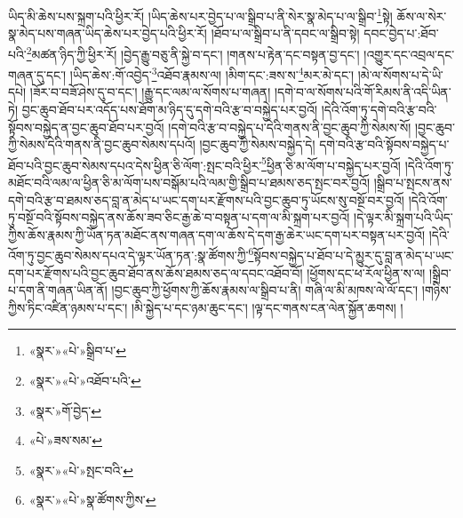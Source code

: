 ཡིད་མི་ཆེས་པས་སྐྲག་པའི་ཕྱིར་རོ། །ཡིད་ཆེས་པར་བྱེད་པ་ལ་སྒྲིབ་པ་ནི་སེར་སྣ་མེད་པ་ལ་སྒྲིབ་\footnote{«སྣར་»«པེ་»སྒྲིབ་པ་}སྟེ། ཆོས་ལ་སེར་སྣ་མེད་པས་གཞན་ཡིད་ཆེས་པར་བྱེད་པའི་ཕྱིར་རོ། །ཐོབ་པ་ལ་སྒྲིབ་པ་ནི་དབང་ལ་སྒྲིབ་སྟེ། དབང་བྱེད་པ་:ཐོབ་པའི་\footnote{«སྣར་»«པེ་»འཐོབ་པའི་}མཚན་ཉིད་ཀྱི་ཕྱིར་རོ། །བྱེད་རྒྱུ་བཅུ་ནི་སྐྱེ་བ་དང་། །གནས་པ་རྟེན་དང་བསྟན་བྱ་དང་། །འགྱུར་དང་འབྲལ་དང་གཞན་དུ་དང་། །ཡིད་ཆེས་:གོ་འབྱེད་\footnote{«སྣར་»གོ་བྱེད་}འཐོབ་རྣམས་ལ། །མིག་དང་:ཟས་ས་\footnote{«པེ་»ཟས་སམ་}མར་མེ་དང་། །མེ་ལ་སོགས་པ་དེ་ཡི་དཔེ། །ཟོར་བ་བཟོ་ཤེས་དུ་བ་དང་། །རྒྱུ་དང་ལམ་ལ་སོགས་པ་གཞན། །དགེ་བ་ལ་སོགས་པའི་གོ་རིམས་ནི་འདི་ཡིན་ཏེ། བྱང་ཆུབ་ཐོབ་པར་འདོད་པས་ཐོག་མ་ཉིད་དུ་དགེ་བའི་རྩ་བ་བསྐྱེད་པར་བྱའོ། །དེའི་འོག་ཏུ་དགེ་བའི་རྩ་བའི་སྟོབས་བསྐྱེད་ན་བྱང་ཆུབ་ཐོབ་པར་བྱའོ། །དགེ་བའི་རྩ་བ་བསྐྱེད་པ་དེའི་གནས་ནི་བྱང་ཆུབ་ཀྱི་སེམས་སོ། །བྱང་ཆུབ་ཀྱི་སེམས་དེའི་གནས་ནི་བྱང་ཆུབ་སེམས་དཔའོ། །བྱང་ཆུབ་ཀྱི་སེམས་བསྐྱེད་དེ། དགེ་བའི་རྩ་བའི་སྟོབས་བསྐྱེད་པ་ཐོབ་པའི་བྱང་ཆུབ་སེམས་དཔའ་དེས་ཕྱིན་ཅི་ལོག་:སྤང་བའི་ཕྱིར་\footnote{«སྣར་»«པེ་»སྤང་བའི་}ཕྱིན་ཅི་མ་ལོག་པ་བསྐྱེད་པར་བྱའོ། །དེའི་འོག་ཏུ་མཐོང་བའི་ལམ་ལ་ཕྱིན་ཅི་མ་ལོག་པས་བསྒོམ་པའི་ལམ་གྱི་སྒྲིབ་པ་ཐམས་ཅད་སྤང་བར་བྱའོ། །སྒྲིབ་པ་སྤངས་ནས་དགེ་བའི་རྩ་བ་ཐམས་ཅད་བླ་ན་མེད་པ་ཡང་དག་པར་རྫོགས་པའི་བྱང་ཆུབ་ཏུ་ཡོངས་སུ་བསྔོ་བར་བྱའོ། །དེའི་འོག་ཏུ་བསྔོ་བའི་སྟོབས་བསྐྱེད་ནས་ཆོས་ཟབ་ཅིང་རྒྱ་ཆེ་བ་བསྟན་པ་དག་ལ་མི་སྐྲག་པར་བྱའོ། །དེ་ལྟར་མི་སྐྲག་པའི་ཡིད་ཀྱིས་ཆོས་རྣམས་ཀྱི་ཡོན་ཏན་མཐོང་ནས་གཞན་དག་ལ་ཆོས་དེ་དག་རྒྱ་ཆེར་ཡང་དག་པར་བསྟན་པར་བྱའོ། །དེའི་འོག་ཏུ་བྱང་ཆུབ་སེམས་དཔའ་དེ་ལྟར་ཡོན་ཏན་:སྣ་ཚོགས་ཀྱི་\footnote{«སྣར་»«པེ་»སྣ་ཚོགས་ཀྱིས་}སྟོབས་བསྐྱེད་པ་ཐོབ་པ་དེ་མྱུར་དུ་བླ་ན་མེད་པ་ཡང་དག་པར་རྫོགས་པའི་བྱང་ཆུབ་ཐོབ་ནས་ཆོས་ཐམས་ཅད་ལ་དབང་འཐོབ་བོ། །ཕྱོགས་དང་ཕ་རོལ་ཕྱིན་ས་ལ། །སྒྲིབ་པ་དག་ནི་གཞན་ཡིན་ནོ། །བྱང་ཆུབ་ཀྱི་ཕྱོགས་ཀྱི་ཆོས་རྣམས་ལ་སྒྲིབ་པ་ནི། གཞི་ལ་མི་མཁས་ལེ་ལོ་དང་། །གཉིས་ཀྱིས་ཏིང་འཛིན་ཉམས་པ་དང་། །མི་སྐྱེད་པ་དང་ཉམ་ཆུང་དང་། །ལྟ་དང་གནས་ངན་ལེན་སྐྱོན་ཆགས། །

